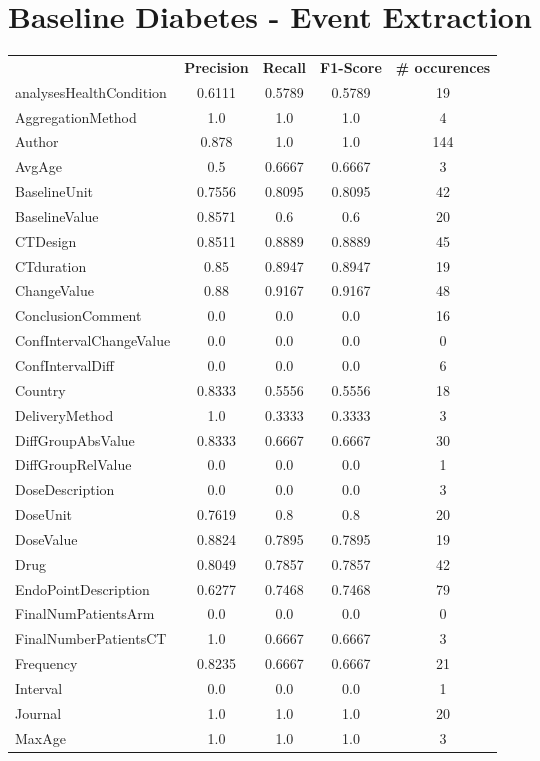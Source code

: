 \section{Baseline Diabetes - Event Extraction}
\begin{longtable}{ l c c c c}
 & \textbf{Precision} & \textbf{Recall} & \textbf{F1-Score} & \textbf{\# occurences} \\ \cline{1-5}
analysesHealthCondition & 0.6111 & 0.5789 & 0.5789 & 19\\
AggregationMethod & 1.0 & 1.0 & 1.0 & 4\\
Author & 0.878 & 1.0 & 1.0 & 144\\
AvgAge & 0.5 & 0.6667 & 0.6667 & 3\\
BaselineUnit & 0.7556 & 0.8095 & 0.8095 & 42\\
BaselineValue & 0.8571 & 0.6 & 0.6 & 20\\
CTDesign & 0.8511 & 0.8889 & 0.8889 & 45\\
CTduration & 0.85 & 0.8947 & 0.8947 & 19\\
ChangeValue & 0.88 & 0.9167 & 0.9167 & 48\\
ConclusionComment & 0.0 & 0.0 & 0.0 & 16\\
ConfIntervalChangeValue & 0.0 & 0.0 & 0.0 & 0\\
ConfIntervalDiff & 0.0 & 0.0 & 0.0 & 6\\
Country & 0.8333 & 0.5556 & 0.5556 & 18\\
DeliveryMethod & 1.0 & 0.3333 & 0.3333 & 3\\
DiffGroupAbsValue & 0.8333 & 0.6667 & 0.6667 & 30\\
DiffGroupRelValue & 0.0 & 0.0 & 0.0 & 1\\
DoseDescription & 0.0 & 0.0 & 0.0 & 3\\
DoseUnit & 0.7619 & 0.8 & 0.8 & 20\\
DoseValue & 0.8824 & 0.7895 & 0.7895 & 19\\
Drug & 0.8049 & 0.7857 & 0.7857 & 42\\
EndoPointDescription & 0.6277 & 0.7468 & 0.7468 & 79\\
FinalNumPatientsArm & 0.0 & 0.0 & 0.0 & 0\\
FinalNumberPatientsCT & 1.0 & 0.6667 & 0.6667 & 3\\
Frequency & 0.8235 & 0.6667 & 0.6667 & 21\\
Interval & 0.0 & 0.0 & 0.0 & 1\\
Journal & 1.0 & 1.0 & 1.0 & 20\\
MaxAge & 1.0 & 1.0 & 1.0 & 3\\

\end{longtable}
